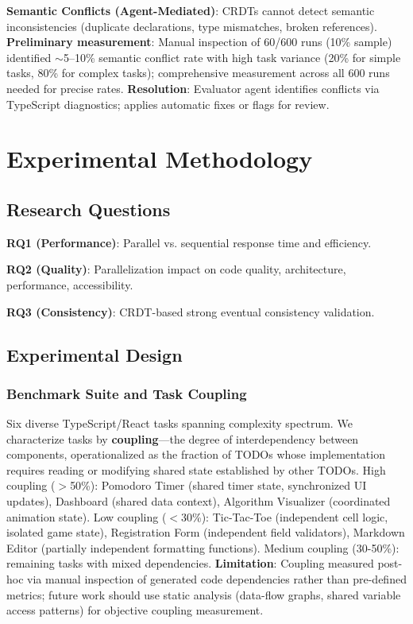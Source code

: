 \documentclass{article}
\begin{document}
\textbf{Semantic Conflicts (Agent-Mediated)}: CRDTs cannot detect semantic inconsistencies (duplicate declarations, type mismatches, broken references). \textbf{Preliminary measurement}: Manual inspection of 60/600 runs (10\% sample) identified $\sim$5--10\% semantic conflict rate with high task variance (20\% for simple tasks, 80\% for complex tasks); comprehensive measurement across all 600 runs needed for precise rates. \textbf{Resolution}: Evaluator agent identifies conflicts via TypeScript diagnostics; applies automatic fixes or flags for review.

\section{Experimental Methodology}
\label{sec:evaluation}

\subsection{Research Questions}

\textbf{RQ1 (Performance)}: Parallel vs. sequential response time and efficiency.

\textbf{RQ2 (Quality)}: Parallelization impact on code quality, architecture, performance, accessibility.

\textbf{RQ3 (Consistency)}: CRDT-based strong eventual consistency validation.

\subsection{Experimental Design}

\subsubsection{Benchmark Suite and Task Coupling}

Six diverse TypeScript/React tasks spanning complexity spectrum. We characterize tasks by \textbf{coupling}---the degree of interdependency between components, operationalized as the fraction of TODOs whose implementation requires reading or modifying shared state established by other TODOs. High coupling ($>$50\%): Pomodoro Timer (shared timer state, synchronized UI updates), Dashboard (shared data context), Algorithm Visualizer (coordinated animation state). Low coupling ($<$30\%): Tic-Tac-Toe (independent cell logic, isolated game state), Registration Form (independent field validators), Markdown Editor (partially independent formatting functions). Medium coupling (30-50\%): remaining tasks with mixed dependencies. \textbf{Limitation}: Coupling measured post-hoc via manual inspection of generated code dependencies rather than pre-defined metrics; future work should use static analysis (data-flow graphs, shared variable access patterns) for objective coupling measurement.
\end{document}

